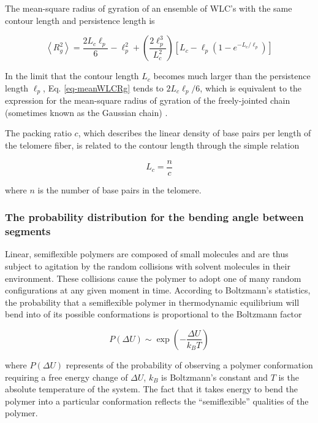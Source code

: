 \documentclass[12pt, a4paper]{article}
\begin{document}
The mean-square radius of gyration of an ensemble of WLC's with the
same contour length and persistence length is \cite{nakamura-2008}

\begin{equation}
  \label{eq-meanWLCRg}
  \left< R_{g}^2 \right> = \frac{2 L_{c} \ell_{p}}{6} - \ell_{p}^2 + \left( \frac{2 \ell_p^3}{L_c^2} \right) \left[ L_c - \ell_p \left( 1 - e^{-L_c/\ell_p} \right) \right]
\end{equation}

In the limit that the contour length $L_c$ becomes much larger than
the persistence length $\ell_p$, Eq. \eqref{eq-meanWLCRg} tends to
$2 L_c \ell_{p}/6$, which is equivalent to the expression for the
mean-square radius of gyration of the freely-jointed chain
(sometimes known as the Gaussian chain) \cite{phillips-pbotc-2009}.

The packing ratio $c$, which describes the linear density of base
pairs per length of the telomere fiber, is related to the contour
length through the simple relation

\begin{equation}
  \label{eq-packingRatio}
  L_c = \frac{n}{c}
\end{equation}

where $n$ is the number of base pairs in the telomere.

\subsubsection{The probability distribution for the bending angle between segments}
\label{sec-2-1-1}

Linear, semiflexible polymers are composed of small molecules and
are thus subject to agitation by the random collisions with
solvent molecules in their environment. These collisions cause the
polymer to adopt one of many random configurations at any given
moment in time. According to Boltzmann's statistics, the
probability that a semiflexible polymer in thermodynamic
equilibrium will bend into of its possible conformations is
proportional to the Boltzmann factor

\begin{equation}
  \label{eq-boltzmann}
  P \left( \Delta U \right) \sim \exp \left( -\frac{\Delta U}{k_B T}\right)
\end{equation}

where $P \left( \Delta U \right)$ represents of the probability of
observing a polymer conformation requiring a free energy change of
$\Delta U$, $k_B$ is Boltzmann's constant and $T$ is the absolute
temperature of the system. The fact that it takes energy to bend
the polymer into a particular conformation reflects the
``semiflexible'' qualities of the polymer.
\end{document}
